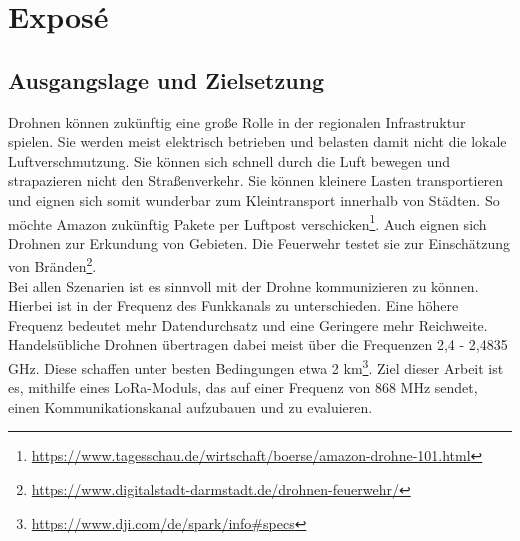 \chapter{Exposé}

\section{Ausgangslage und Zielsetzung}
Drohnen können zukünftig eine große Rolle in der regionalen Infrastruktur spielen. Sie werden meist elektrisch betrieben und belasten damit nicht die lokale Luftverschmutzung. Sie können sich schnell durch die Luft bewegen und strapazieren nicht den Straßenverkehr. Sie können kleinere Lasten transportieren und eignen sich somit wunderbar zum Kleintransport innerhalb von Städten. So möchte Amazon zukünftig Pakete per Luftpost verschicken\footnote{\url{https://www.tagesschau.de/wirtschaft/boerse/amazon-drohne-101.html}}. Auch eignen sich Drohnen zur Erkundung von Gebieten. Die Feuerwehr testet sie zur Einschätzung von Bränden\footnote{\url{https://www.digitalstadt-darmstadt.de/drohnen-feuerwehr/}}.\\
Bei allen Szenarien ist es sinnvoll mit der Drohne kommunizieren zu können. Hierbei ist in der Frequenz des Funkkanals zu unterschieden. Eine höhere Frequenz bedeutet mehr Datendurchsatz und eine Geringere mehr Reichweite. Handelsübliche Drohnen übertragen dabei meist über die Frequenzen 2,4 - 2,4835 GHz. Diese schaffen unter besten Bedingungen etwa 2 km\footnote{\url{https://www.dji.com/de/spark/info\#specs}}. Ziel dieser Arbeit ist es, mithilfe eines LoRa-Moduls, das auf einer Frequenz von 868 MHz sendet, einen Kommunikationskanal aufzubauen und zu evaluieren.

